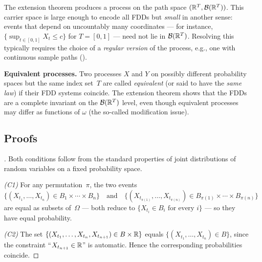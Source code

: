\begin{remark}
The extension theorem produces a process on the path space
$(\mathbb{R}^T, \mathcal{B}(\mathbb{R}^T))$. This carrier space is large enough to
encode all FDDs but \emph{small} in another sense: events that
depend on uncountably many coordinates — for instance,
$\{\sup_{t \in [0, 1]} X_t \leq c\}$ for $T = [0, 1]$ — need not
lie in $\mathcal{B}(\mathbb{R}^T)$. Resolving this typically requires the
choice of a \emph{regular version} of the process, e.g., one with
continuous sample paths (\cite[Ch.~II,~\S~2]{Sevastyanov1982}).
\end{remark}

\medskip
\noindent\textbf{Equivalent processes.} Two processes $X$ and $Y$
on possibly different probability spaces but the same index
set~$T$ are called \emph{equivalent} (or said to have the
\emph{same law}) if their FDD systems coincide. The extension
theorem shows that the FDDs are a complete invariant on the
$\mathcal{B}(\mathbb{R}^T)$ level, even though equivalent processes may
differ as functions of $\omega$ (the so-called modification
issue).

\subsection*{Proofs}

\begin{proof}[]
Both conditions follow from the standard properties of joint
distributions of random variables on a fixed probability space.

\emph{(C1)} For any permutation~$\pi$, the two events
\[
  \{(X_{t_1}, \dots, X_{t_n}) \in B_1 \times \cdots \times B_n\}
  \quad \text{and} \quad
  \{(X_{t_{\pi(1)}}, \dots, X_{t_{\pi(n)}}) \in B_{\pi(1)} \times \cdots \times B_{\pi(n)}\}
\]
are equal as subsets of~$\Omega$ — both reduce to
$\{X_{t_i} \in B_i \text{ for every } i\}$ — so they have equal
probability.

\emph{(C2)} The set
$\{(X_{t_1}, \dots, X_{t_n}, X_{t_{n+1}}) \in B \times \mathbb{R}\}$ equals
$\{(X_{t_1}, \dots, X_{t_n}) \in B\}$, since the constraint
``$X_{t_{n+1}} \in \mathbb{R}$'' is automatic. Hence the corresponding
probabilities coincide.
\end{proof}

